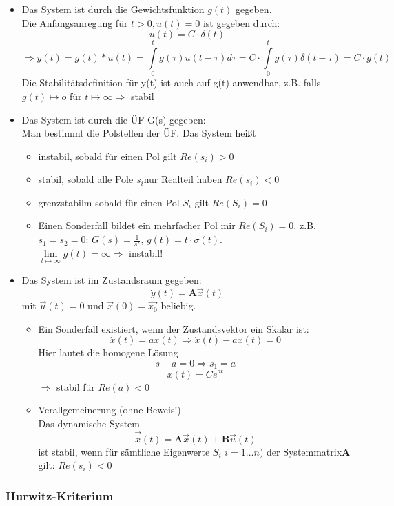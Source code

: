 \message{ !name(Mitschrieb_SysRegel.tex)}\documentclass[12pt,a4paper,ngerman]{scrartcl}
\begin{document}
\begin{itemize}
\item Das System ist durch die Gewichtsfunktion $g(t)$ gegeben.\\
 Die Anfangsanregung für $t>0, u(t)=0$ ist gegeben durch:
\[u(t)=C\cdot \delta (t) \]
\[
\Rightarrow y(t)=g(t)*u(t)=\int\limits_0^t{g(\tau)u(t-\tau)d\tau}= C\cdot \int\limits_0^t{g(\tau)\delta(t-\tau)}=C\cdot g(t)
\]
Die Stabilitätsdefinition für y(t) ist auch auf g(t) anwendbar, z.B. falls $g(t)\mapsto o$ für $t\mapsto \infty \Rightarrow$ stabil
\item Das System ist durch die ÜF G(s) gegeben:\\

Man bestimmt die Polstellen der ÜF. Das System heißt
\begin{itemize}
\item instabil, sobald für einen Pol gilt $Re(s_i)>0$
\item stabil, sobald alle Pole $s_i$nur Realteil haben $Re(s_i)<0$
\item grenzstabilm sobald für einen Pol $S_i$ gilt $Re(S_i)=0$
\item Einen Sonderfall bildet ein mehrfacher Pol mir $Re(S_i)=0$. z.B. $s_1=s_2=0$:
$G(s)=\frac{1}{s^2}$, $g(t)=t\cdot \sigma(t)$.\\
$\lim\limits_{t\mapsto \infty}{g(t)=\infty} \Rightarrow$ instabil! 
\end{itemize}
\item Das System ist im  Zustandsraum gegeben:
\[
\dot{y}(t)=\mathbf{A}\vec{x}(t)
\]
mit $\vec{u}(t)=0$ und $\vec{x}(0)=\vec{x_0}$ beliebig.
\begin{itemize}
\item Ein Sonderfall existiert, wenn der Zustandsvektor ein Skalar ist:
\[
\dot{x}(t)=ax(t)\Rightarrow \dot{x}(t)-ax(t)=0
\]
Hier lautet die homogene Lösung
\[
s-a=0 \Rightarrow s_1=a
\]
\[
x(t)=Ce^{at}
\]
$\Rightarrow$ stabil für $Re(a)<0$
\item Verallgemeinerung (ohne Beweis!)\\
Das dynamische System 
\[
\vec{\dot{x}}(t)=\mathbf{A}\vec{x}(t)+\mathbf{B}\vec{u}(t)
\] 
ist stabil, wenn für sämtliche Eigenwerte $S_i$ $i=1\dots n)$ der Systemmatrix$\mathbf{A}$ gilt: $Re(s_i)<0$
\end{itemize}
\end{itemize}

\subsubsection{Hurwitz-Kriterium}
\end{document}
